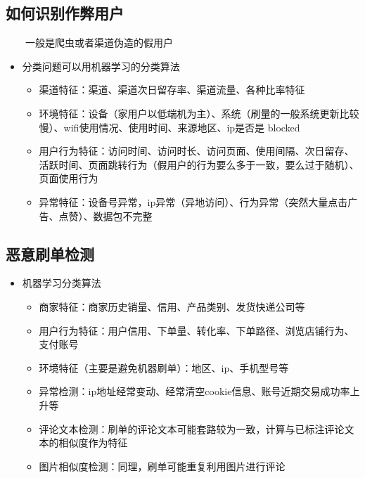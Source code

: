 \documentclass[
  letterpaper,
  DIV=11,
  numbers=noendperiod]{scrreprt}
\begin{document}
\subsection{如何识别作弊用户}\label{ux5982ux4f55ux8bc6ux522bux4f5cux5f0aux7528ux6237}

  一般是爬虫或者渠道伪造的假用户

\begin{itemize}
\item
  分类问题可以用机器学习的分类算法

  \begin{itemize}
  \item
    渠道特征：渠道、渠道次日留存率、渠道流量、各种比率特征
  \item
    环境特征：设备（家用户以低端机为主）、系统（刷量的一般系统更新比较慢）、wifi使用情况、使用时间、来源地区、ip是否是
    blocked
  \item
    用户行为特征：访问时间、访问时长、访问页面、使用间隔、次日留存、活跃时间、页面跳转行为（假用户的行为要么多于一致，要么过于随机）、页面使用行为
  \item
    异常特征：设备号异常，ip异常（异地访问）、行为异常（突然大量点击广告、点赞）、数据包不完整
  \end{itemize}
\end{itemize}

\subsection{恶意刷单检测}\label{ux6076ux610fux5237ux5355ux68c0ux6d4b}

\begin{itemize}
\item
  机器学习分类算法

  \begin{itemize}
  \item
    商家特征：商家历史销量、信用、产品类别、发货快递公司等
  \item
    用户行为特征：用户信用、下单量、转化率、下单路径、浏览店铺行为、支付账号
  \item
    环境特征（主要是避免机器刷单）：地区、ip、手机型号等
  \item
    异常检测：ip地址经常变动、经常清空cookie信息、账号近期交易成功率上升等
  \item
    评论文本检测：刷单的评论文本可能套路较为一致，计算与已标注评论文本的相似度作为特征
  \item
    图片相似度检测：同理，刷单可能重复利用图片进行评论
  \end{itemize}
\end{itemize}
\end{document}
